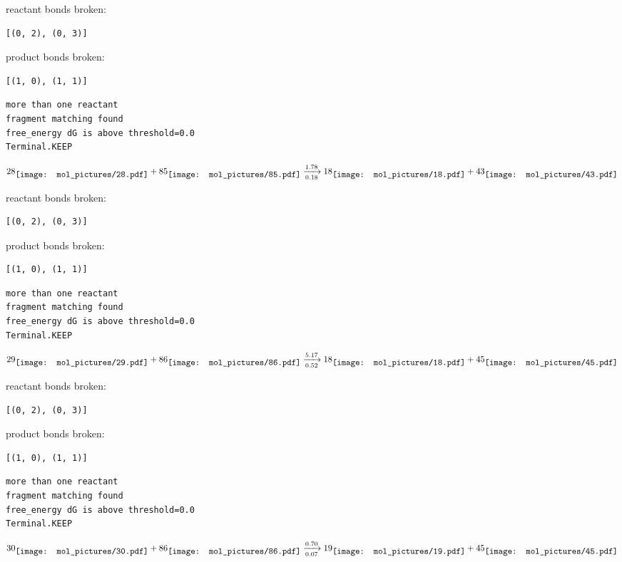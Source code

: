 \documentclass{article}
\begin{document}
reactant bonds broken:\begin{verbatim}
[(0, 2), (0, 3)]
\end{verbatim}
product bonds broken:\begin{verbatim}
[(1, 0), (1, 1)]
\end{verbatim}




\vspace{1cm}
\begin{verbatim}
more than one reactant
fragment matching found
free_energy dG is above threshold=0.0
Terminal.KEEP
\end{verbatim}
$$
28
\raisebox{-.5\height}{\texttt{[image: mol\_pictures/28.pdf]}}
+
85
\raisebox{-.5\height}{\texttt{[image: mol\_pictures/85.pdf]}}
\xrightarrow[0.18]{1.78}
18
\raisebox{-.5\height}{\texttt{[image: mol\_pictures/18.pdf]}}
+
43
\raisebox{-.5\height}{\texttt{[image: mol\_pictures/43.pdf]}}
$$


reactant bonds broken:\begin{verbatim}
[(0, 2), (0, 3)]
\end{verbatim}
product bonds broken:\begin{verbatim}
[(1, 0), (1, 1)]
\end{verbatim}




\vspace{1cm}
\begin{verbatim}
more than one reactant
fragment matching found
free_energy dG is above threshold=0.0
Terminal.KEEP
\end{verbatim}
$$
29
\raisebox{-.5\height}{\texttt{[image: mol\_pictures/29.pdf]}}
+
86
\raisebox{-.5\height}{\texttt{[image: mol\_pictures/86.pdf]}}
\xrightarrow[0.52]{5.17}
18
\raisebox{-.5\height}{\texttt{[image: mol\_pictures/18.pdf]}}
+
45
\raisebox{-.5\height}{\texttt{[image: mol\_pictures/45.pdf]}}
$$


reactant bonds broken:\begin{verbatim}
[(0, 2), (0, 3)]
\end{verbatim}
product bonds broken:\begin{verbatim}
[(1, 0), (1, 1)]
\end{verbatim}




\vspace{1cm}
\begin{verbatim}
more than one reactant
fragment matching found
free_energy dG is above threshold=0.0
Terminal.KEEP
\end{verbatim}
$$
30
\raisebox{-.5\height}{\texttt{[image: mol\_pictures/30.pdf]}}
+
86
\raisebox{-.5\height}{\texttt{[image: mol\_pictures/86.pdf]}}
\xrightarrow[0.07]{0.70}
19
\raisebox{-.5\height}{\texttt{[image: mol\_pictures/19.pdf]}}
+
45
\raisebox{-.5\height}{\texttt{[image: mol\_pictures/45.pdf]}}
$$
\end{document}
